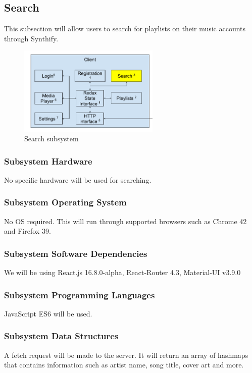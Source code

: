 \subsection{Search}
This subsection will allow users to search for playlists on their music accounts through Synthify.

\begin{figure}[h!]
	\centering
 	\includegraphics[width=0.60\textwidth]{images/client/client_search.png}
 	\caption{Search subsystem}
\end{figure}

\subsubsection{Subsystem Hardware}
No specific hardware will be used for searching.

\subsubsection{Subsystem Operating System}
No OS required. This will run through supported browsers such as Chrome 42 and Firefox 39.

\subsubsection{Subsystem Software Dependencies}
We will be using React.js 16.8.0-alpha, React-Router 4.3, Material-UI v3.9.0

\subsubsection{Subsystem Programming Languages}
JavaScript ES6 will be used.

\subsubsection{Subsystem Data Structures}
A fetch request will be made to the server. It will return an array of hashmaps that contains information such as artist name, song title, cover art and more.

\newpage
